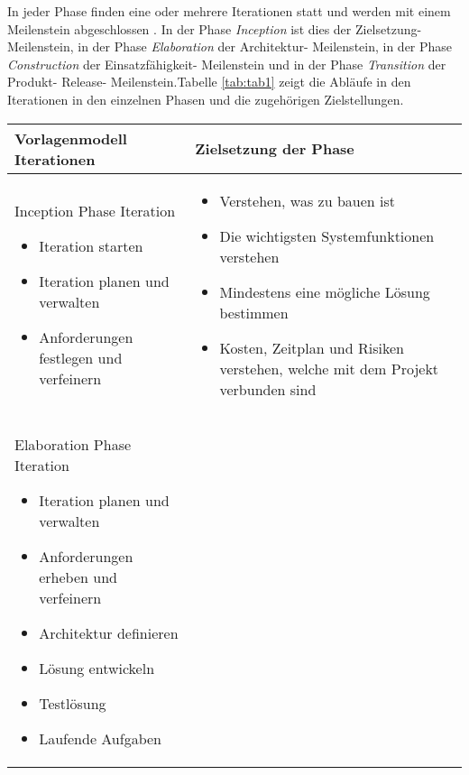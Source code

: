 In jeder Phase finden eine oder mehrere Iterationen statt und werden mit einem Meilenstein abgeschlossen \cite{Basem2010}. In der Phase \textit{Inception} ist dies der Zielsetzung- Meilenstein, in der Phase \textit{Elaboration} der Architektur- Meilenstein, in der Phase \textit{Construction} der Einsatzfähigkeit- Meilenstein und in der Phase \textit{Transition} der Produkt- Release- Meilenstein.Tabelle \ref{tab:tab1} zeigt die Abläufe in den Iterationen in den einzelnen Phasen und die zugehörigen Zielstellungen.
\begin{longtable}{|p{7cm}|p{8cm}|}
\hline
Vorlagenmodell Iterationen & Zielsetzung der Phase \\
\hline
Inception Phase Iteration 
\begin {itemize}
\item Iteration starten 
 \item  Iteration planen und verwalten
 \item  Anforderungen festlegen und verfeinern 
  \end{itemize}
   &
  
  \begin {itemize}
\item Verstehen, was zu bauen ist
 \item Die wichtigsten Systemfunktionen verstehen 
\item Mindestens eine mögliche Lösung bestimmen
\item Kosten, Zeitplan und Risiken verstehen, welche mit dem Projekt verbunden sind
  \end{itemize}

 \\
\hline
 Elaboration Phase Iteration 
   \begin {itemize}
   \item Iteration planen und verwalten
   \item Anforderungen erheben und verfeinern
   \item Architektur definieren
   \item Lösung entwickeln
   \item Testlösung
   \item Laufende Aufgaben
   
  \end{itemize}


\end{longtable}
